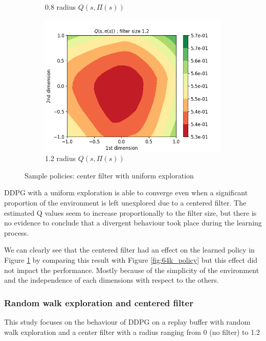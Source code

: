 \documentclass{article}
\begin{document}
\begin{figure}[H]
\begin{subfigure}[b]{0.3\linewidth}
      \caption{0.8 radius $Q(s, \Pi(s))$}
  \end{subfigure}
   \begin{subfigure}[b]{0.3\linewidth}
    \includegraphics[width=\linewidth]{Study_2/2.1/visualizations/Q_contour_1_2.png}
      \caption{1.2 radius $Q(s, \Pi(s))$}
  \end{subfigure}
   \caption{Sample policies: center filter with uniform exploration}
    \label{fig:center_contour_uniform}
\end{figure}

DDPG with a uniform exploration is able to converge even when a significant proportion of the environment is left unexplored due to a centered filter.
The estimated Q values seem to increase proportionally to the filter size, but there is no evidence to conclude that a divergent behaviour took place during the learning process.

We can clearly see that the centered filter had an effect on the learned policy in Figure \ref{fig:center_contour_uniform} by comparing this result with Figure \ref{fig:64k_policy} but this effect did not impact the performance. Mostly because of the simplicity of the environment and the independence of each dimensions with respect to the others.

\subsubsection{Random walk exploration and centered filter}

This study focuses on the behaviour of DDPG on a replay buffer with random walk exploration and a  center filter with a radius ranging from 0 (no filter) to 1.2
\end{document}
